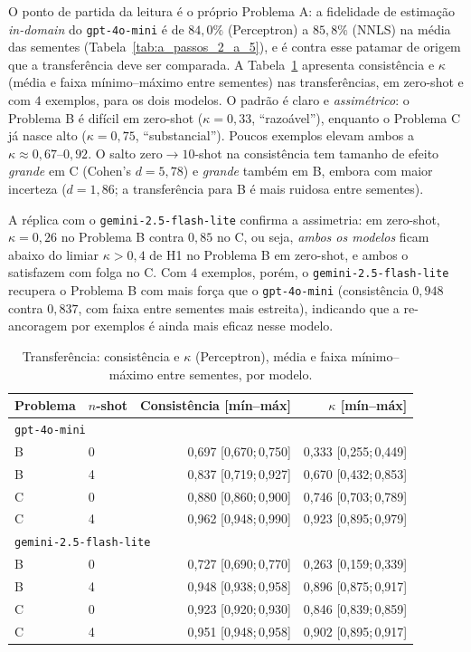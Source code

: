 \documentclass[12pt,a4paper]{article}
\begin{document}
O ponto de partida da leitura é o próprio Problema A: a fidelidade de estimação
\emph{in-domain} do \texttt{gpt-4o-mini} é de $84{,}0\%$ (Perceptron) a $85{,}8\%$ (NNLS)
na média das sementes
(Tabela~\ref{tab:a_passos_2_a_5}), e é contra esse patamar de origem que a transferência deve ser
comparada. A Tabela~\ref{tab:bc_passo3} apresenta consistência e $\kappa$ (média e faixa
mínimo--máximo entre sementes) nas transferências, em zero-shot e com $4$ exemplos, para os dois modelos. O
padrão é claro e
\emph{assimétrico}: o Problema B é difícil em zero-shot ($\kappa = 0{,}33$, ``razoável''),
enquanto o Problema C já nasce alto ($\kappa = 0{,}75$, ``substancial''). Poucos exemplos
elevam ambos a $\kappa \approx 0{,}67$–$0{,}92$. O salto zero$\to$$10$-shot na consistência
tem tamanho de efeito \emph{grande} em C (Cohen's $d = 5{,}78$) e \emph{grande} também em B,
embora com maior incerteza ($d = 1{,}86$; a transferência para B é mais ruidosa entre
sementes).

A réplica com o \texttt{gemini-2.5-flash-lite} confirma a assimetria: em zero-shot,
$\kappa = 0{,}26$ no Problema B contra $0{,}85$ no C, ou seja, \emph{ambos os modelos}
ficam abaixo do limiar $\kappa > 0{,}4$ de H1 no Problema B em zero-shot, e ambos o
satisfazem com folga no C. Com $4$ exemplos, porém, o \texttt{gemini-2.5-flash-lite}
recupera o Problema B com mais força que o \texttt{gpt-4o-mini} (consistência $0{,}948$
contra $0{,}837$, com faixa entre sementes mais estreita), indicando que a re-ancoragem por exemplos é
ainda mais eficaz nesse modelo.

\begin{table}[ht]
\centering
\caption{Transferência: consistência e $\kappa$ (Perceptron), média e faixa
mínimo--máximo entre sementes, por modelo.}
\label{tab:bc_passo3}
\small
\begin{tabular}{llrr}
\toprule
\textbf{Problema} & \textbf{$n$-shot} & \textbf{Consistência [mín--máx]} &
\textbf{$\kappa$ [mín--máx]} \\
\midrule
\multicolumn{4}{l}{\texttt{gpt-4o-mini}} \\
\midrule
B & 0 & 0,697 [0,670;\,0,750] & 0,333 [0,255;\,0,449] \\
B & 4 & 0,837 [0,719;\,0,927] & 0,670 [0,432;\,0,853] \\
C & 0 & 0,880 [0,860;\,0,900] & 0,746 [0,703;\,0,789] \\
C & 4 & 0,962 [0,948;\,0,990] & 0,923 [0,895;\,0,979] \\
\midrule
\multicolumn{4}{l}{\texttt{gemini-2.5-flash-lite}} \\
\midrule
B & 0 & 0,727 [0,690;\,0,770] & 0,263 [0,159;\,0,339] \\
B & 4 & 0,948 [0,938;\,0,958] & 0,896 [0,875;\,0,917] \\
C & 0 & 0,923 [0,920;\,0,930] & 0,846 [0,839;\,0,859] \\
C & 4 & 0,951 [0,948;\,0,958] & 0,902 [0,895;\,0,917] \\
\bottomrule
\end{tabular}
\end{table}
\end{document}

